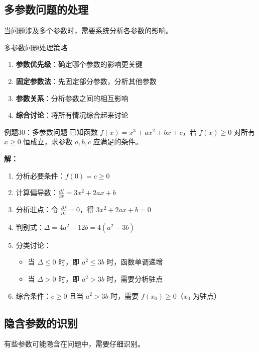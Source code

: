 \documentclass[a4paper,11pt]{ctexart}
\newcommand{\partialder}[2]{\frac{\partial #1}{\partial #2}}
\theoremstyle{definition}
\theoremstyle{remark}
\begin{document}
\subsection{多参数问题的处理}

当问题涉及多个参数时，需要系统分析各参数的影响。

\begin{methodbox}{多参数问题处理策略}
\begin{enumerate}
    \item \textbf{参数优先级}：确定哪个参数的影响更关键
    \item \textbf{固定参数法}：先固定部分参数，分析其他参数
    \item \textbf{参数关系}：分析参数之间的相互影响
    \item \textbf{综合讨论}：将所有情况综合起来讨论
\end{enumerate}
\end{methodbox}

\begin{examplebox}{例题30：多参数问题}
已知函数 $f(x) = x^3 + ax^2 + bx + c$，若 $f(x) \geq 0$ 对所有 $x \geq 0$ 恒成立，求参数 $a, b, c$ 应满足的条件。

\textbf{解：}
\begin{enumerate}
    \item 分析必要条件：$f(0) = c \geq 0$
    \item 计算偏导数：$\partialder{f}{x} = 3x^2 + 2ax + b$
    \item 分析驻点：令 $\partialder{f}{x} = 0$，得 $3x^2 + 2ax + b = 0$
    \item 判别式：$\Delta = 4a^2 - 12b = 4(a^2 - 3b)$
    \item 分类讨论：
    \begin{itemize}
        \item 当 $\Delta \leq 0$ 时，即 $a^2 \leq 3b$ 时，函数单调递增
        \item 当 $\Delta > 0$ 时，即 $a^2 > 3b$ 时，需要分析驻点
    \end{itemize}
    \item 综合条件：$c \geq 0$ 且当 $a^2 > 3b$ 时，需要 $f(x_0) \geq 0$（$x_0$ 为驻点）
\end{enumerate}
\end{examplebox}

\subsection{隐含参数的识别}

有些参数可能隐含在问题中，需要仔细识别。
\end{document}

